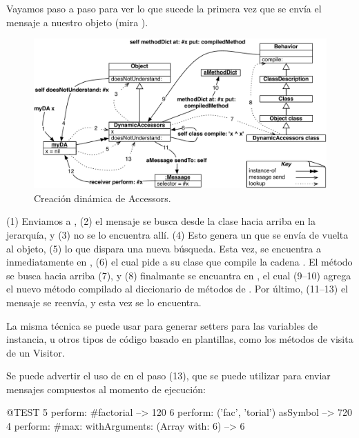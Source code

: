 \documentclass[a4paper,10pt,twoside]{book}
\begin{document}
Vayamos paso a paso para ver lo que sucede la primera vez que se env\'ia
el mensaje  a nuestro objeto (mira ).

\begin{figure}[ht]\centering
        \includegraphics[width=\linewidth]{DynamicAccessors}
        \caption{Creaci\'on din\'amica de Accessors.}
\end{figure}

(1) Enviamos  a , (2) el mensaje se busca desde la
clase hacia arriba en la jerarqu\'ia, y (3) no se lo encuentra all\'i.
(4) Esto genera un  que se env\'ia de
vuelta al objeto, (5) lo que dispara una nueva b\'usqueda.  Esta vez, se
encuentra a  inmediatamente en
, (6) el cual pide a su clase que compile la
cadena .  El m\'etodo  se busca hacia arriba
(7), y (8) finalmante se encuantra en , el cual (9--10)
agrega el nuevo m\'etodo compilado al diccionario de m\'etodos de
.  Por \'ultimo, (11--13) el mensaje se reenv\'ia, y
esta vez se lo encuentra.

La misma t\'ecnica se puede usar para generar setters para las variables
de instancia, u otros tipos de c\'odigo basado en plantillas, como los
m\'etodos de visita de un Visitor.

Se puede advertir el uso de  en el paso
(13), que se puede utilizar para enviar mensajes compuestos al momento
de ejecuci\'on:
\begin{code}{@TEST}
5 perform: #factorial                                             --> 120
6 perform: ('fac', 'torial') asSymbol                       --> 720
4 perform: #max: withArguments: (Array with: 6) --> 6
\end{code}
\end{document}
